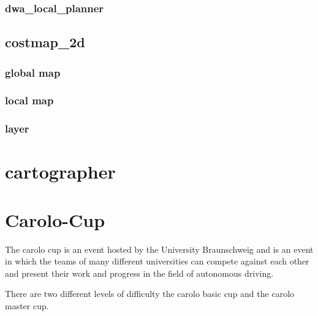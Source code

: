 \subsubsection{dwa\_local\_planner}
\subsection{costmap\_2d}
\subsubsection{global map}
\subsubsection{local map}
\subsubsection{layer}

\section{cartographer} 
\section{Carolo-Cup}
The carolo cup is an event hosted by the University Braunschweig and is an event in which the teams of many different universities can compete against each other and present their work and progress in the field of autonomous driving.

There are two different levels of difficulty the carolo basic cup and the carolo master cup.













